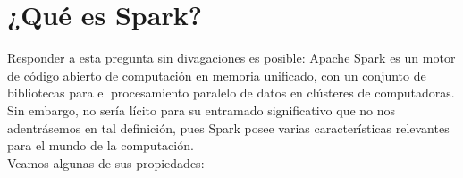 \chapter{¿Qué es Spark?}
\fancyhead[RE,LO]{\leftmark} 
\fancyhead[LE,RO]{\rightmark} 
\fancyfoot[CE,CO]{\thepage} 
Responder a esta pregunta sin divagaciones es posible: Apache Spark es un motor de código abierto de computación en memoria unificado, con un conjunto de bibliotecas para el procesamiento paralelo de datos en clústeres de computadoras. Sin embargo, no sería lícito para su entramado significativo que no nos adentrásemos en tal definición, pues Spark  posee varias características  relevantes para el mundo de la computación.\\

Veamos algunas de sus propiedades:\\

